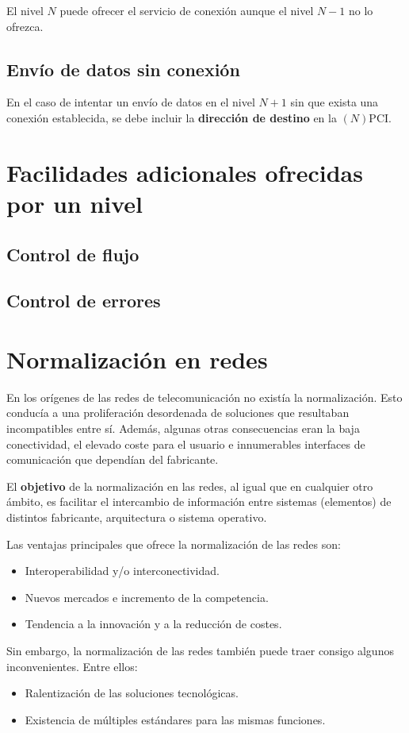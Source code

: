 \documentclass[a4paper]{book}
\begin{document}
El nivel $N$ puede ofrecer el servicio de conexión aunque el nivel $N-1$ no lo ofrezca.


\subsection{Envío de datos sin conexión}
En el caso de intentar un envío de datos en el nivel $N+1$ sin que exista una conexión establecida, se debe incluir la \textbf{dirección de destino} en la $(N)$PCI.

\section{Facilidades adicionales ofrecidas por un nivel}
\subsection{Control de flujo}
\subsection{Control de errores}

\section{Normalización en redes}
En los orígenes de las redes de telecomunicación no existía la normalización. Esto conducía a una proliferación desordenada de soluciones que resultaban incompatibles entre sí. Además, algunas otras consecuencias eran la baja conectividad, el elevado coste para el usuario e innumerables interfaces de comunicación que dependían del fabricante.

El \textbf{objetivo} de la normalización en las redes, al igual que en cualquier otro ámbito, es facilitar el intercambio de información entre sistemas (elementos) de distintos fabricante, arquitectura o sistema operativo.

Las ventajas principales que ofrece la normalización de las redes son:
\begin{itemize}
  \item Interoperabilidad y/o interconectividad.
  \item Nuevos mercados e incremento de la competencia.
  \item Tendencia a la innovación y a la reducción de costes.
\end{itemize}

Sin embargo, la normalización de las redes también puede traer consigo algunos inconvenientes. Entre ellos:
\begin{itemize}
  \item Ralentización de las soluciones tecnológicas.
  \item Existencia de múltiples estándares para las mismas funciones.
\end{itemize}
\end{document}
